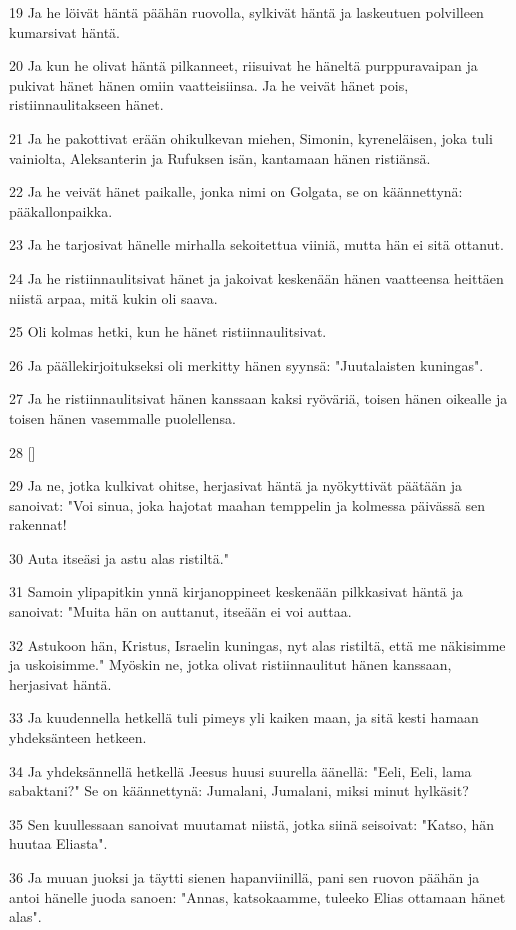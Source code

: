 \par 19 Ja he löivät häntä päähän ruovolla, sylkivät häntä ja laskeutuen polvilleen kumarsivat häntä.
\par 20 Ja kun he olivat häntä pilkanneet, riisuivat he häneltä purppuravaipan ja pukivat hänet hänen omiin vaatteisiinsa. Ja he veivät hänet pois, ristiinnaulitakseen hänet.
\par 21 Ja he pakottivat erään ohikulkevan miehen, Simonin, kyreneläisen, joka tuli vainiolta, Aleksanterin ja Rufuksen isän, kantamaan hänen ristiänsä.
\par 22 Ja he veivät hänet paikalle, jonka nimi on Golgata, se on käännettynä: pääkallonpaikka.
\par 23 Ja he tarjosivat hänelle mirhalla sekoitettua viiniä, mutta hän ei sitä ottanut.
\par 24 Ja he ristiinnaulitsivat hänet ja jakoivat keskenään hänen vaatteensa heittäen niistä arpaa, mitä kukin oli saava.
\par 25 Oli kolmas hetki, kun he hänet ristiinnaulitsivat.
\par 26 Ja päällekirjoitukseksi oli merkitty hänen syynsä: "Juutalaisten kuningas".
\par 27 Ja he ristiinnaulitsivat hänen kanssaan kaksi ryöväriä, toisen hänen oikealle ja toisen hänen vasemmalle puolellensa.
\par 28 []
\par 29 Ja ne, jotka kulkivat ohitse, herjasivat häntä ja nyökyttivät päätään ja sanoivat: "Voi sinua, joka hajotat maahan temppelin ja kolmessa päivässä sen rakennat!
\par 30 Auta itseäsi ja astu alas ristiltä."
\par 31 Samoin ylipapitkin ynnä kirjanoppineet keskenään pilkkasivat häntä ja sanoivat: "Muita hän on auttanut, itseään ei voi auttaa.
\par 32 Astukoon hän, Kristus, Israelin kuningas, nyt alas ristiltä, että me näkisimme ja uskoisimme." Myöskin ne, jotka olivat ristiinnaulitut hänen kanssaan, herjasivat häntä.
\par 33 Ja kuudennella hetkellä tuli pimeys yli kaiken maan, ja sitä kesti hamaan yhdeksänteen hetkeen.
\par 34 Ja yhdeksännellä hetkellä Jeesus huusi suurella äänellä: "Eeli, Eeli, lama sabaktani?" Se on käännettynä: Jumalani, Jumalani, miksi minut hylkäsit?
\par 35 Sen kuullessaan sanoivat muutamat niistä, jotka siinä seisoivat: "Katso, hän huutaa Eliasta".
\par 36 Ja muuan juoksi ja täytti sienen hapanviinillä, pani sen ruovon päähän ja antoi hänelle juoda sanoen: "Annas, katsokaamme, tuleeko Elias ottamaan hänet alas".

